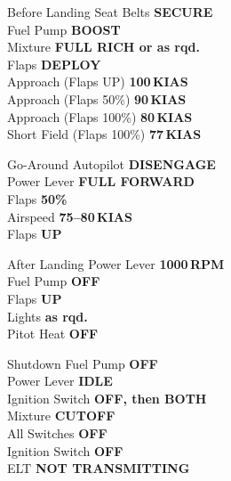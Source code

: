 \documentclass{article}
\newcommand{\checkitem}[2]{#1 \dotfill \textbf{#2} \\}
\begin{document}
\begin{multicols}{3}
    \begin{checklistbox}{Before Landing}
        \checkitem{Seat Belts}{SECURE}
        \checkitem{Fuel Pump}{BOOST}
        \checkitem{Mixture}{FULL RICH or as rqd.}
        \checkitem{Flaps}{DEPLOY}
         \checkitem{Approach (Flaps UP)}{100\,KIAS}
         \checkitem{Approach (Flaps 50\%)}{90\,KIAS}
         \checkitem{Approach (Flaps 100\%)}{80\,KIAS}
         \checkitem{Short Field (Flaps 100\%)}{77\,KIAS}
    \end{checklistbox}

    \begin{checklistbox}{Go-Around}
        \checkitem{Autopilot}{DISENGAGE}
        \checkitem{Power Lever}{FULL FORWARD}
        \checkitem{Flaps}{50\%}
        \checkitem{Airspeed}{75--80\,KIAS}
        \checkitem{Flaps}{UP}
    \end{checklistbox}

    \begin{checklistbox}{After Landing}
        \checkitem{Power Lever}{1000\,RPM}
        \checkitem{Fuel Pump}{OFF}
        \checkitem{Flaps}{UP}
        \checkitem{Lights}{as rqd.}
        \checkitem{Pitot Heat}{OFF}
    \end{checklistbox}

    \begin{checklistbox}{Shutdown}
        \checkitem{Fuel Pump}{OFF}
        \checkitem{Power Lever}{IDLE}
        \checkitem{Ignition Switch}{OFF, then BOTH}
        \checkitem{Mixture}{CUTOFF}
        \checkitem{All Switches}{OFF}
        \checkitem{Ignition Switch}{OFF}
        \checkitem{ELT}{NOT TRANSMITTING}
    \end{checklistbox}


\end{multicols}
\end{document}
